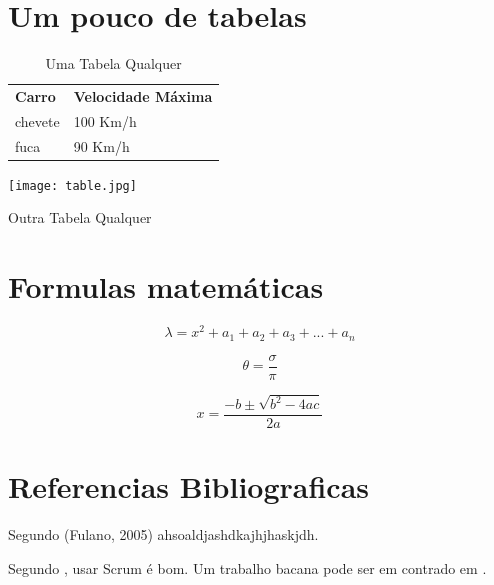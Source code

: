 \documentclass[conference]{IEEEtran}
\begin{document}
	
	\section{Um pouco de tabelas}
	
	\begin{table}[]
		\centering
		\begin{tabular}{ll}
			\textbf{Carro}   & \textbf{Velocidade Máxima} \\
			chevete & 100 Km/h          \\
			fuca    & 90 Km/h           \\
		\end{tabular}
		\caption{Uma Tabela Qualquer}
		\label{tabela}
	\end{table}

	\begin{table}[]
		\centering
		\texttt{[image: table.jpg]}
		\caption{Outra Tabela Qualquer}
		\label{tabelaImagem}
	\end{table}

	
	\section{Formulas matemáticas}
	
	$$\lambda = {x^2 + a_1 + a_2 + a_3 + ... + a_n }$$
	
	
	
	$$
	\theta  = \frac{\sigma}{\pi}
	$$
	
	
	\begin{equation}
	x=\frac{-b\pm\sqrt{b^2-4ac}}{2a} 
	\label{bask}
	\end{equation}
	
	
	\section{Referencias Bibliograficas}
	
	Segundo (Fulano, 2005) ahsoaldjashdkajhjhaskjdh.
	
	Segundo \cite{scrumGuide}, usar Scrum é bom. Um trabalho bacana pode ser em contrado em \cite{16SBG_suscity}.
	
	
	
	


	
	
	
	
	
\end{document}
